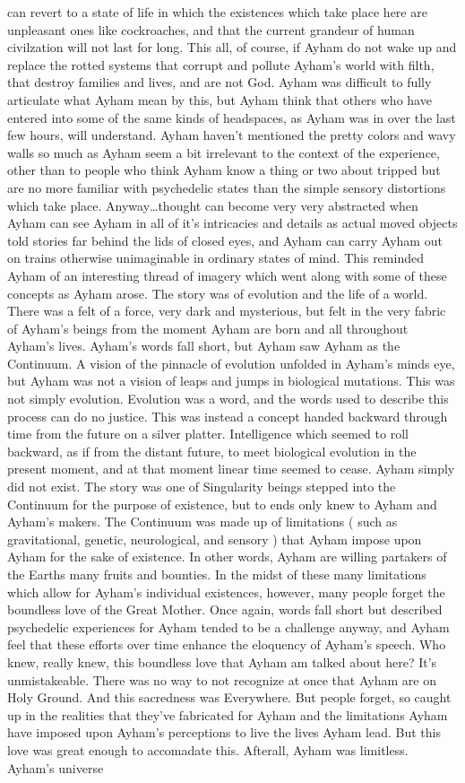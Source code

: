 \documentclass[12pt]{book}
\begin{document}
can revert to a state of life in which the existences which take place here are unpleasant ones like cockroaches, and that the current grandeur of human civilzation will not last for long. This all, of course, if Ayham do not wake up and replace the rotted systems that corrupt and pollute Ayham's world with filth, that destroy families and lives, and are not God. Ayham was difficult to fully articulate what Ayham mean by this, but Ayham think that others who have entered into some of the same kinds of headspaces, as Ayham was in over the last few hours, will understand. Ayham haven't mentioned the pretty colors and wavy walls so much as Ayham seem a bit irrelevant to the context of the experience, other than to people who think Ayham know a thing or two about tripped but are no more familiar with psychedelic states than the simple sensory distortions which take place. Anyway\ldots thought can become very very abstracted when Ayham can see Ayham in all of it's intricacies and details as actual moved objects told stories far behind the lids of closed eyes, and Ayham can carry Ayham out on trains otherwise unimaginable in ordinary states of mind. This reminded Ayham of an interesting thread of imagery which went along with some of these concepts as Ayham arose. The story was of evolution and the life of a world. There was a felt of a force, very dark and mysterious, but felt in the very fabric of Ayham's beings from the moment Ayham are born and all throughout Ayham's lives. Ayham's words fall short, but Ayham saw Ayham as the Continuum. A vision of the pinnacle of evolution unfolded in Ayham's minds eye, but Ayham was not a vision of leaps and jumps in biological mutations. This was not simply evolution. Evolution was a word, and the words used to describe this process can do no justice. This was instead a concept handed backward through time from the future on a silver platter. Intelligence which seemed to roll backward, as if from the distant future, to meet biological evolution in the present moment, and at that moment linear time seemed to cease. Ayham simply did not exist. The story was one of Singularity beings stepped into the Continuum for the purpose of existence, but to ends only knew to Ayham and Ayham's makers. The Continuum was made up of limitations ( such as gravitational, genetic, neurological, and sensory ) that Ayham impose upon Ayham for the sake of existence. In other words, Ayham are willing partakers of the Earths many fruits and bounties. In the midst of these many limitations which allow for Ayham's individual existences, however, many people forget the boundless love of the Great Mother. Once again, words fall short but described psychedelic experiences for Ayham tended to be a challenge anyway, and Ayham feel that these efforts over time enhance the eloquency of Ayham's speech. Who knew, really knew, this boundless love that Ayham am talked about here? It's unmistakeable. There was no way to not recognize at once that Ayham are on Holy Ground. And this sacredness was Everywhere. But people forget, so caught up in the realities that they've fabricated for Ayham and the limitations Ayham have imposed upon Ayham's perceptions to live the lives Ayham lead. But this love was great enough to accomadate this. Afterall, Ayham was limitless. Ayham's universe 
\end{document}
